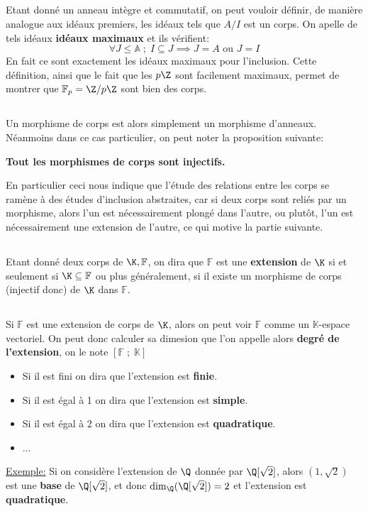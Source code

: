 \subsection*{}
Etant donné un anneau intègre et commutatif, on peut vouloir définir, de manière analogue aux idéaux premiers, les idéaux tels que \( A/I \) est un corps. On apelle de tels idéaux \textbf{idéaux maximaux} et ils vérifient:
\[ 
   \forall J \leq \mathbb{A} \; ; \; I \subseteq J \implies J = A \text{ ou } J = I 
\]
En fait ce sont exactement les idéaux maximaux pour l'inclusion. Cette définition, ainsi que le fait que les \( p\Z \) sont facilement maximaux, permet de montrer que \(\mathbb{F}_p = \Z/p\Z\) sont bien des corps.
\subsection*{}
Un morphisme de corps est alors simplement un morphisme d'anneaux. Néanmoins dans ce cas particulier, on peut noter la proposition suivante:
\begin{center}
   \textbf{Tout les morphismes de corps sont injectifs.}
\end{center}
En particulier ceci nous indique que l'étude des relations entre les corps se ramène à des études d'inclusion abstraites, car si deux corps sont reliés par un morphisme, alors l'un est nécessairement plongé dans l'autre, ou plutôt, l'un est nécessairement une extension de l'autre, ce qui motive la partie suivante.
\subsection*{}
Etant donné deux corps de \( \K, \mathbb{F}\), on dira que \( \mathbb{F} \) est une \textbf{extension} de \( \K \) si et seulement si \( \K \subseteq \mathbb{F} \) ou plus généralement, si il existe un morphisme de corps (injectif donc) de \( \K \) dans \(\mathbb{F}\).
\subsection*{}
Si \( \mathbb{F} \) est une extension de corps de \( \K \), alors on peut voir \(\mathbb{F}\) comme un \(\mathbb{K}\)-espace vectoriel. On peut donc calculer sa dimesion que l'on appelle alors \textbf{degré de l'extension}, on le note \( [\mathbb{F} \; ; \; \mathbb{K}] \)
\begin{itemize}
   \item Si il est fini on dira que l'extension est \textbf{finie}.
   \item Si il est égal à 1 on dira que l'extension est \textbf{simple}.
   \item Si il est égal à 2 on dira que l'extension est \textbf{quadratique}.
   \item ...
\end{itemize}
\uline{Exemple:} Si on considère l'extension de \(\Q\) donnée par \(\Q[\sqrt{2}]\), alors \( (1, \sqrt{2}) \) est une \textbf{base} de \(\Q[\sqrt{2}]\), et donc \( \text{dim}_\Q(\Q[\sqrt{2}]) = 2\) et l'extension est \textbf{quadratique}.
\pagebreak

